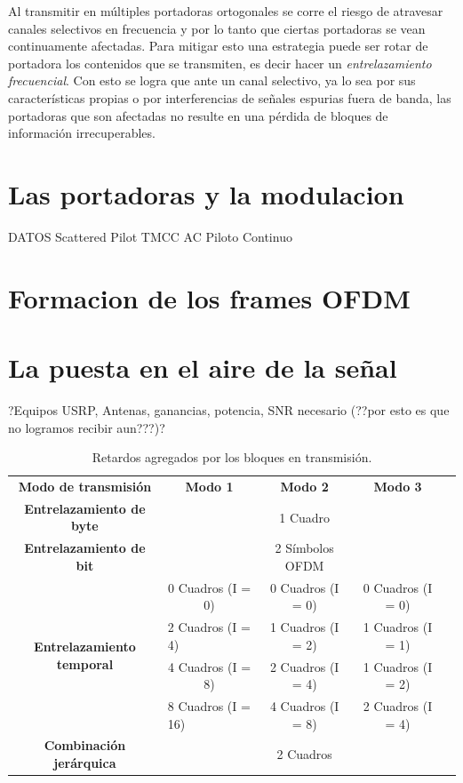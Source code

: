 Al transmitir en m\'ultiples portadoras ortogonales se corre el riesgo de atravesar canales selectivos en frecuencia y por lo tanto que ciertas portadoras se vean continuamente afectadas. Para mitigar esto una estrategia puede ser rotar de portadora los contenidos que se transmiten, es decir hacer un \textit{entrelazamiento frecuencial}. Con esto se logra que ante un canal selectivo, ya lo sea por sus caracter\'isticas propias o por interferencias de señales espurias fuera de banda, las portadoras que son afectadas no resulte en una p\'erdida de bloques de informaci\'on irrecuperables.


\section{Las portadoras y la modulacion}


DATOS
Scattered Pilot
TMCC
AC
Piloto Continuo
\section{Formacion de los frames OFDM}
\section{La puesta en el aire de la señal}

?Equipos USRP, Antenas, ganancias, potencia, SNR necesario (??por esto es que no logramos recibir aun???)?

\begin{table}[h!]
\centering
\begin{tabular}{|c|cccc}   %
\cline{1-4}
\textbf{Modo de transmisi\'on} & \multicolumn{1}{c|}{\textbf{Modo 1}} & \multicolumn{1}{c|}{\textbf{Modo 2}} & \multicolumn{1}{c|}{\textbf{Modo 3}} &  \\ \cline{1-4}
\textbf{Entrelazamiento de byte} 					&                   			  & 1 Cuadro 					   & \multicolumn{1}{c|}{} 			&  \\ \cline{1-4}
\textbf{Entrelazamiento de bit} 						&					   			  & 2 S\'imbolos OFDM 			   & \multicolumn{1}{c|}{} 			&  \\ \cline{1-4}
\multirow{4}{*}{\textbf{Entrelazamiento temporal}}	&\multicolumn{1}{c|}{0 Cuadros (I = 0)} & \multicolumn{1}{c|}{0 Cuadros (I = 0)} & \multicolumn{1}{c|}{0 Cuadros (I = 0)} &  \\ \cline{2-4}
  										    &\multicolumn{1}{l|}{2 Cuadros (I = 4)} & \multicolumn{1}{c|}{1 Cuadros (I = 2)} & \multicolumn{1}{c|}{1 Cuadros (I = 1)} &  \\ \cline{2-4}
											&\multicolumn{1}{c|}{4 Cuadros (I = 8)} & \multicolumn{1}{c|}{2 Cuadros (I = 4)} & \multicolumn{1}{c|}{1 Cuadros (I = 2)} &  \\ \cline{2-4}
											&\multicolumn{1}{l|}{8 Cuadros (I = 16)} & \multicolumn{1}{c|}{4 Cuadros (I = 8)} & \multicolumn{1}{c|}{2 Cuadros (I = 4)} &  \\ \cline{1-4}
\textbf{Combinaci\'on jer\'arquica}			& 				   			    & 2 Cuadros 			 & \multicolumn{1}{c|}{} 		  &  \\ \cline{1-4}
\end{tabular}
\caption{\label{delays_agregados} Retardos agregados por los bloques en transmisi\'on.}
\end{table}